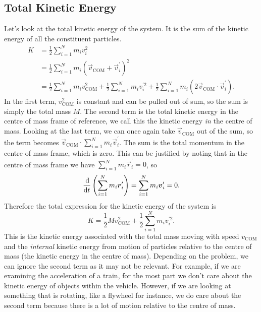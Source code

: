 \documentclass[../classical_mechanics.tex]{subfiles}
\begin{document}
        \subsection{Total Kinetic Energy}\label{subsec:total-kinetic-energy}
            Let's look at the total kinetic energy of the system.
            It is the sum of the kinetic energy of all the constituent particles.
            \begin{align}
                K&=\frac{1}{2}\sum_{i=1}^N m_iv_i^2\\
                &=\frac{1}{2}\sum_{i=1}^N m_i(\vec{v}_\text{COM}+\vec{v}_i^\prime)^2\\
                &=\frac{1}{2}\sum_{i=1}^N m_i v_\text{COM}^2+\frac{1}{2}\sum_{i=1}^N m_i v_i^{\prime 2}+\frac{1}{2}\sum_{i=1}^N m_i(2\vec{v}_\text{COM}\cdot\vec{v}_i^\prime).
            \end{align}
            In the first term, $v_\text{COM}^2$ is constant and can be pulled out of sum, so the sum is simply the total mass $M$.
            The second term is the total kinetic energy in the centre of mass frame of reference, we call this the kinetic energy \textit{in} the centre of mass.
            Looking at the last term, we can once again take $\vec{v}_\text{COM}$ out of the sum, so the term becomes $\vec{v}_\text{COM}\cdot\sum_{i=1}^N m_i\vec{v}_i^\prime$.
            The sum is the total momentum in the centre of mass frame, which is zero.
            This can be justified by noting that in the centre of mass frame we have $\sum_{i=1}^N m_i\vec{r}_i^\prime=0$, so
            \begin{equation}
                \dv{}{t}\left(\sum_{i=1}^N m_i\vec{r}_i^\prime\right)=\sum_{i=1}^N m_i\vec{v}_i^\prime=0.
            \end{equation}
            Therefore the total expression for the kinetic energy of the system is
            \begin{equation}
                K=\frac{1}{2}M v_\text{COM}^2+\frac{1}{2}\sum_{i=1}^N m_i v_i^{\prime 2}.
            \end{equation}
            This is the kinetic energy associated with the total mass moving with speed $v_\text{COM}$ and the \textit{internal} kinetic energy from motion of particles relative to the centre of mass (the kinetic energy in the centre of mass).
            Depending on the problem, we can ignore the second term as it may not be relevant.
            For example, if we are examining the acceleration of a train, for the most part we don't care about the kinetic energy of objects within the vehicle.
            However, if we are looking at something that is rotating, like a flywheel for instance, we do care about the second term because there is a lot of motion relative to the centre of mass.
\end{document}
